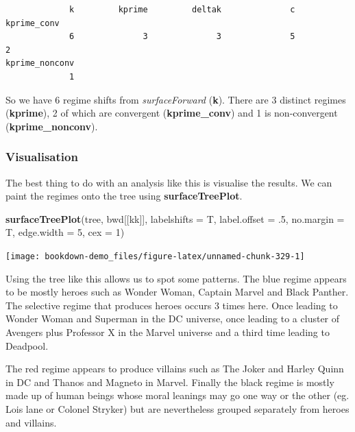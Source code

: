 \documentclass[
]{book}
\newenvironment{Shaded}{\begin{snugshade}}{\end{snugshade}}
\newcommand{\DataTypeTok}[1]{\textcolor[rgb]{0.13,0.29,0.53}{#1}}
\newcommand{\DecValTok}[1]{\textcolor[rgb]{0.00,0.00,0.81}{#1}}
\newcommand{\FloatTok}[1]{\textcolor[rgb]{0.00,0.00,0.81}{#1}}
\newcommand{\KeywordTok}[1]{\textcolor[rgb]{0.13,0.29,0.53}{\textbf{#1}}}
\newcommand{\NormalTok}[1]{#1}
\begin{document}
\begin{verbatim}
             k         kprime         deltak              c    kprime_conv 
             6              3              3              5              2 
kprime_nonconv 
             1 
\end{verbatim}

So we have 6 regime shifts from \emph{surfaceForward} (\textbf{k}). There are 3 distinct regimes (\textbf{kprime}), 2 of which are convergent (\textbf{kprime\_conv}) and 1 is non-convergent (\textbf{kprime\_nonconv}).

\hypertarget{visualisation}{%
\subsubsection{Visualisation}\label{visualisation}}

The best thing to do with an analysis like this is visualise the results. We can paint the regimes onto the tree using \textbf{surfaceTreePlot}.

\begin{Shaded}
\begin{Highlighting}[]
\KeywordTok{surfaceTreePlot}\NormalTok{(tree, bwd[[kk]], }\DataTypeTok{labelshifts =}\NormalTok{ T, }\DataTypeTok{label.offset =} \FloatTok{.5}\NormalTok{, }
                \DataTypeTok{no.margin =}\NormalTok{ T, }\DataTypeTok{edge.width =} \DecValTok{5}\NormalTok{, }\DataTypeTok{cex =} \DecValTok{1}\NormalTok{)}
\end{Highlighting}
\end{Shaded}

\begin{center}\texttt{[image: bookdown-demo\_files/figure-latex/unnamed-chunk-329-1]} \end{center}

Using the tree like this allows us to spot some patterns. The blue regime appears to be mostly heroes such as Wonder Woman, Captain Marvel and Black Panther. The selective regime that produces heroes occurs 3 times here. Once leading to Wonder Woman and Superman in the DC universe, once leading to a cluster of Avengers plus Professor X in the Marvel universe and a third time leading to Deadpool.

The red regime appears to produce villains such as The Joker and Harley Quinn in DC and Thanos and Magneto in Marvel. Finally the black regime is mostly made up of human beings whose moral leanings may go one way or the other (eg. Lois lane or Colonel Stryker) but are nevertheless grouped separately from heroes and villains.
\end{document}

